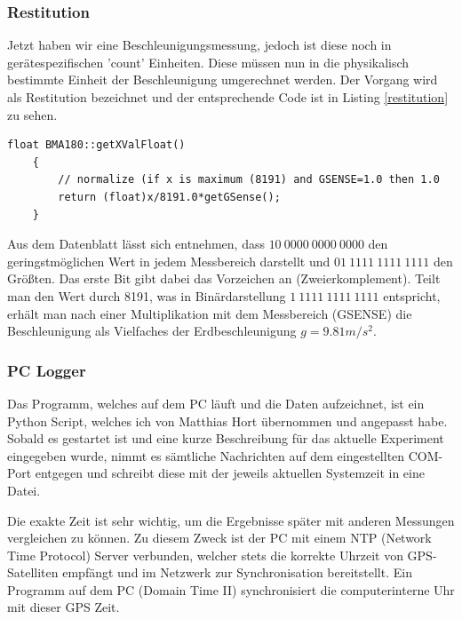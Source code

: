 \documentclass[12pt,a4paper,twoside,BCOR=12.5mm]{scrartcl}
\begin{document}
\clearpage
\subsubsection{Restitution}

Jetzt haben wir eine Beschleunigungsmessung, jedoch ist diese noch in gerätespezifischen 'count' Einheiten. Diese müssen nun in die physikalisch bestimmte Einheit der Beschleunigung umgerechnet werden. Der Vorgang wird als Restitution bezeichnet und der entsprechende Code ist in Listing \ref{restitution} zu sehen. \\

\begin{lstlisting}[frame=trBL]
	float BMA180::getXValFloat()
	{
	    // normalize (if x is maximum (8191) and GSENSE=1.0 then 1.0
	    return (float)x/8191.0*getGSense();
	}
\end{lstlisting}

Aus dem Datenblatt \citep{Sensortec:2009rt} lässt sich entnehmen, dass $10~0000~0000~0000$ den geringstmöglichen Wert in jedem Messbereich darstellt und $01~1111~1111~1111$ den Größten. Das erste Bit gibt dabei das Vorzeichen an (Zweierkomplement). Teilt man den Wert durch 8191, was in Binärdarstellung $1~1111~1111~1111$ entspricht, erhält man nach einer Multiplikation mit dem Messbereich (GSENSE) die Beschleunigung als Vielfaches der Erdbeschleunigung $g = 9.81 m/s^2$.


\subsubsection{PC Logger}

Das Programm, welches auf dem PC läuft und die Daten aufzeichnet, ist ein Python Script, welches ich von Matthias Hort übernommen und angepasst habe. Sobald es gestartet ist und eine kurze Beschreibung für das aktuelle Experiment eingegeben wurde, nimmt es sämtliche Nachrichten auf dem eingestellten COM-Port entgegen und schreibt diese mit der jeweils aktuellen Systemzeit in eine Datei.

Die exakte Zeit ist sehr wichtig, um die Ergebnisse später mit anderen Messungen vergleichen zu können. Zu diesem Zweck ist der PC mit einem NTP (Network Time Protocol) Server verbunden, welcher stets die korrekte Uhrzeit von GPS-Satelliten empfängt und im Netzwerk zur Synchronisation bereitstellt. Ein Programm auf dem PC (Domain Time II) synchronisiert die computerinterne Uhr mit dieser GPS Zeit.
\end{document}
